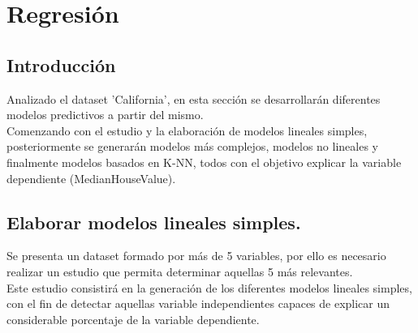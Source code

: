\chapter{Regresión}

\section{Introducción}
Analizado el dataset 'California', en esta sección se desarrollarán diferentes modelos predictivos a partir del mismo. \\

Comenzando con el estudio y la elaboración de modelos lineales simples, posteriormente se generarán modelos más complejos, modelos no lineales y finalmente modelos basados en K-NN, todos con el objetivo explicar la variable dependiente (MedianHouseValue).




\section{Elaborar modelos lineales simples.}

Se presenta un dataset formado por más de 5 variables, por ello es necesario realizar un estudio que permita determinar aquellas 5 más relevantes.\\

Este estudio consistirá en la generación de los diferentes modelos lineales simples, con el fin de detectar aquellas variable independientes capaces de explicar un considerable porcentaje de la variable dependiente. \\

